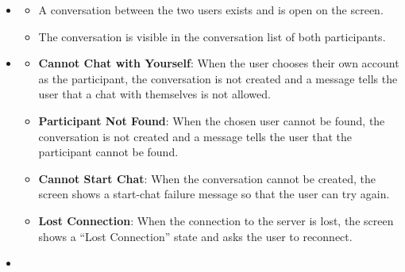 \begin{itemize}[leftmargin=1.6em,topsep=4pt,itemsep=3pt,parsep=0pt,label=$\bullet$]
\begin{itemize}[leftmargin=2.2em,topsep=2pt,itemsep=3pt,parsep=0pt,label=$\circ$]
            \item \textbf{Conversation Already Exists}: When a conversation with the chosen user already exists, the system opens the existing conversation instead of creating a second one, so there is only one thread per pair of users.
            \item \textbf{Not Logged In}: When a guest clicks the ``Connect with client'' button, the system asks the user to log in before the conversation can be started.
            \item \textbf{Cancel}: When the user leaves the compose screen or closes the dialog without confirming, no conversation is created and nothing changes.
        \end{itemize}
    \item {}
        \begin{itemize}[leftmargin=2.2em,topsep=2pt,itemsep=3pt,parsep=0pt,label=$\circ$]
            \item A conversation between the two users exists and is open on the screen.
            \item The conversation is visible in the conversation list of both participants.
        \end{itemize}
    \item {}
        \begin{itemize}[leftmargin=2.2em,topsep=2pt,itemsep=3pt,parsep=0pt,label=$\circ$]
            \item \textbf{Cannot Chat with Yourself}: When the user chooses their own account as the participant, the conversation is not created and a message tells the user that a chat with themselves is not allowed.
            \item \textbf{Participant Not Found}: When the chosen user cannot be found, the conversation is not created and a message tells the user that the participant cannot be found.
            \item \textbf{Cannot Start Chat}: When the conversation cannot be created, the screen shows a start-chat failure message so that the user can try again.
            \item \textbf{Lost Connection}: When the connection to the server is lost, the screen shows a ``Lost Connection'' state and asks the user to reconnect.
        \end{itemize}
    \item {}
        \begin{itemize}[leftmargin=2.2em,topsep=2pt,itemsep=3pt,parsep=0pt,label=$\circ$]

\end{itemize}
\end{itemize}

